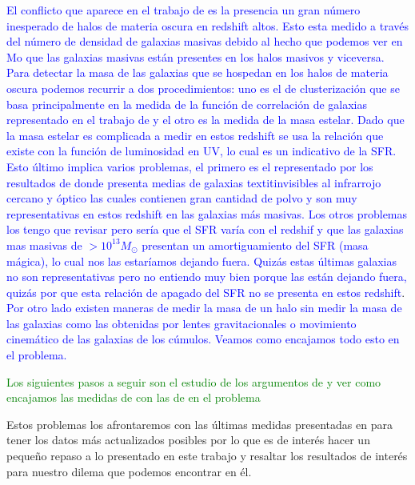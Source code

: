 \textcolor{blue}{El conflicto que aparece en el trabajo de \cite{steinhardt2016impossibly} es la presencia un gran número inesperado de halos de materia oscura en redshift altos. Esto esta medido a través del número de densidad de galaxias masivas debido al hecho que podemos ver en Mo que las galaxias masivas están presentes en los halos masivos y viceversa. Para detectar la masa de las galaxias que se hospedan en los halos de materia oscura podemos recurrir a dos procedimientos: uno es el de clusterización que se basa principalmente en la medida de la función de correlación de galaxias representado en el trabajo de \cite{hildebrandt2009cars} y el otro es la medida de la masa estelar. Dado que la masa estelar es complicada a medir en estos redshift se usa la relación que existe con la función de luminosidad en UV, lo cual es un indicativo de la SFR. Esto último implica varios problemas, el primero es el representado por los resultados de \cite{wang2019dominant} donde presenta medias de galaxias textit{invisibles} al infrarrojo cercano y óptico las cuales contienen gran cantidad de polvo y son muy representativas en estos redshift en las galaxias más masivas. Los otros problemas los tengo que revisar pero sería que el SFR varía con el redshif y que las galaxias mas masivas de $>10^{13}M_{\odot}$ presentan un amortiguamiento del SFR (masa mágica), lo cual nos las estaríamos dejando fuera. Quizás estas últimas galaxias no son representativas pero no entiendo muy bien porque las están dejando fuera, quizás por que esta relación de apagado del SFR no se presenta en estos redshift}.\\

\textcolor{blue}{Por otro lado existen maneras de medir la masa de un halo sin medir la masa de las galaxias como las obtenidas por lentes gravitacionales o movimiento cinemático de las galaxias de los cúmulos. Veamos como encajamos todo esto en el problema.}

\textcolor{green}{Los siguientes pasos a seguir son el estudio de los argumentos de \cite{behroozi2018mostmassive} y ver como encajamos las medidas de \cite{wang2019dominant} con las de \cite{behroozi2019universemachine} en el problema}

Estos problemas los afrontaremos con las últimas medidas presentadas en \cite{behroozi2019universemachine} para tener los datos más actualizados posibles por lo que es de interés hacer un pequeño repaso a lo presentado en este trabajo y resaltar los resultados de interés para nuestro dilema que podemos encontrar en él.

